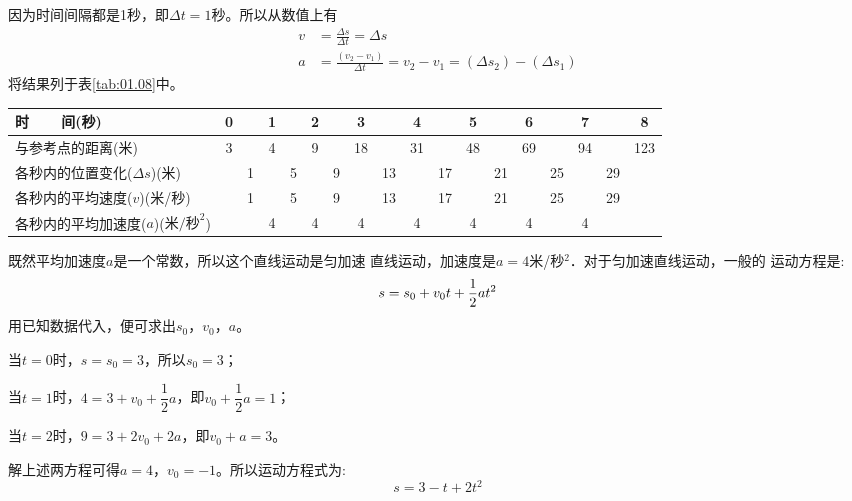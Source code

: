 \solution 因为时间间隔都是1秒，即$\Delta t=1$秒。所以从数值上有
\begin{align*}
    v & =\frac{\Delta s}{\Delta t}=\Delta s                         \\
    a & =\frac{\left(v_2-v_1\right)}{\Delta t}=v_2-v_1=\left(\Delta s_2\right)-\left(\Delta s_1\right)
\end{align*}
将结果列于表\ref{tab:01.08}中。
\begin{tablex}[!h]
        \caption{}
        \label{tab:01.08}
        \centering {}
        \setlength{\tabcolsep}{0em}
        \begin{tabularx}{\linewidth}{l*{17}{|C}}
            \toprule
            时~~~~间(秒)                              & 0 &   & 1 &   & 2 &   & 3  &    & 4  &    & 5  &    & 6  &    & 7  &    & 8   \\
            \midrule
            与参考点的距离(米)                        & 3 &   & 4 &   & 9 &   & 18 &    & 31 &    & 48 &    & 69 &    & 94 &    & 123 \\
            各秒内的位置变化($\Delta s$)(米)          &   & 1 &   & 5 &   & 9 &    & 13 &    & 17 &    & 21 &    & 25 &    & 29 &     \\
            各秒内的平均速度($v$)(米/秒)              &   & 1 &   & 5 &   & 9 &    & 13 &    & 17 &    & 21 &    & 25 &    & 29 &     \\
            各秒内的平均加速度($a$)($\text{米/秒}^2$) &   &   & 4 &   & 4 &   & 4  &    & 4  &    & 4  &    & 4  &    & 4  &    &     \\
            \bottomrule
        \end{tabularx}
\end{tablex}
\clearpage
既然平均加速度$a$是一个常数，所以这个直线运动是匀加速
直线运动，加速度是$a=4$米/秒$^2$．对于匀加速直线运动，一般的
运动方程是:
\begin{equation*}
    s=s_0+v_{0}t+\frac{1}{2}at^2 \vspace{-0.5em}
\end{equation*}
用已知数据代入，便可求出$s_0$，$v_0$，$a$。

当$t=0$时，$s=s_0=3$，所以$s_0=3$；

当$t=1$时，$4=3+v_0+\dfrac 1 2 a$，即$v_0+\dfrac 1 2 a=1$；

当$t=2$时，$9=3+2v_0+2a$，即$v_0+a=3$。

解上述两方程可得$a=4$，$v_0=-1$。所以运动方程式为:
\begin{equation*}
    s=3-t+2t^2
\end{equation*}

